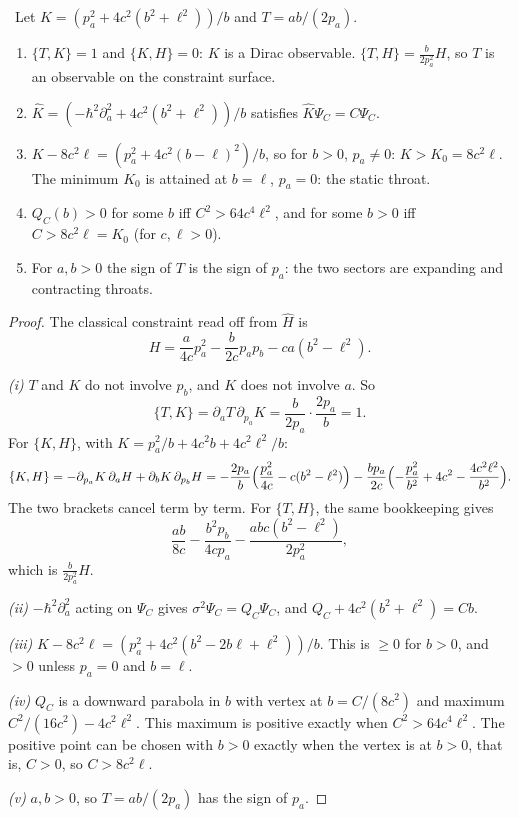 \begin{theorem}\label{thm:observables}\ver\
Let $K=(p_a^2+4c^2(b^2+\ell^2))/b$ and $T=ab/(2p_a)$.
\begin{enumerate}[label=(\roman*)]
\item $\{T,K\}=1$ and $\{K,H\}=0$: $K$ is a Dirac observable. $\{T,H\}=\frac{b}{2p_a^2}H$, so $T$ is an observable on the constraint surface.
\item $\hat K=(-\hbar^2\partial_a^2+4c^2(b^2+\ell^2))/b$ satisfies $\hat K\Psi_C=C\Psi_C$.
\item $K-8c^2\ell=(p_a^2+4c^2(b-\ell)^2)/b$, so for $b>0$, $p_a\ne0$: $K>K_0=8c^2\ell$. The minimum $K_0$ is attained at $b=\ell$, $p_a=0$: the static throat.
\item $Q_C(b)>0$ for some $b$ iff $C^2>64c^4\ell^2$, and for some $b>0$ iff $C>8c^2\ell=K_0$ (for $c,\ell>0$).
\item For $a,b>0$ the sign of $T$ is the sign of $p_a$: the two sectors are expanding and contracting throats.
\end{enumerate}
\end{theorem}
\begin{proof}
The classical constraint read off from $\hat H$ is
\[
H=\frac a{4c}p_a^2-\frac b{2c}p_ap_b-ca(b^2-\ell^2).
\]

\emph{(i)} $T$ and $K$ do not involve $p_b$, and $K$ does not involve $a$. So
\[
\{T,K\}=\partial_aT\,\partial_{p_a}K=\frac b{2p_a}\cdot\frac{2p_a}b=1 .
\]
For $\{K,H\}$, with $K=p_a^2/b+4c^2b+4c^2\ell^2/b$:
\[
\{K,H\}=-\partial_{p_a}K\,\partial_aH+\partial_bK\,\partial_{p_b}H=-\frac{2p_a}b\Bigl(\frac{p_a^2}{4c}-c(b^2-\ell^2)\Bigr)-\frac{bp_a}{2c}\Bigl(-\frac{p_a^2}{b^2}+4c^2-\frac{4c^2\ell^2}{b^2}\Bigr).
\]
The two brackets cancel term by term. For $\{T,H\}$, the same bookkeeping gives
\[
\frac{ab}{8c}-\frac{b^2p_b}{4cp_a}-\frac{abc(b^2-\ell^2)}{2p_a^2},
\]
which is $\frac b{2p_a^2}H$.

\emph{(ii)} $-\hbar^2\partial_a^2$ acting on $\Psi_C$ gives $\sigma^2\Psi_C=Q_C\Psi_C$, and $Q_C+4c^2(b^2+\ell^2)=Cb$.

\emph{(iii)} $K-8c^2\ell=(p_a^2+4c^2(b^2-2b\ell+\ell^2))/b$. This is $\ge0$ for $b>0$, and $>0$ unless $p_a=0$ and $b=\ell$.

\emph{(iv)} $Q_C$ is a downward parabola in $b$ with vertex at $b=C/(8c^2)$ and maximum $C^2/(16c^2)-4c^2\ell^2$. This maximum is positive exactly when $C^2>64c^4\ell^2$. The positive point can be chosen with $b>0$ exactly when the vertex is at $b>0$, that is, $C>0$, so $C>8c^2\ell$.

\emph{(v)} $a,b>0$, so $T=ab/(2p_a)$ has the sign of $p_a$.
\end{proof}


